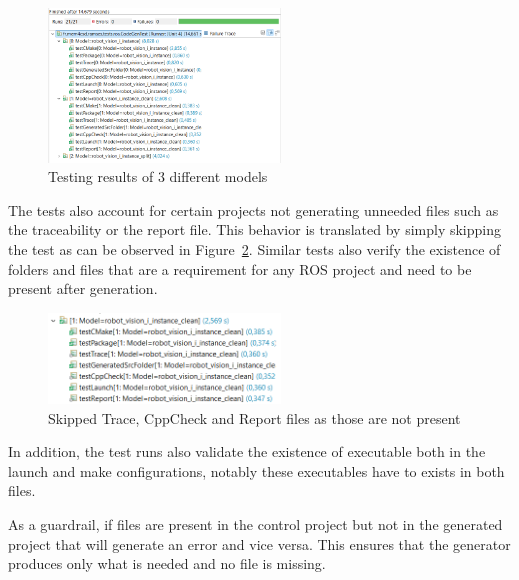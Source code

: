 \begin{figure}[htbp]
	\centering
	\includegraphics[width=0.55\textwidth]{testingResults1.png}
	\caption{Testing results of 3 different models}
	\label{fig:testingResults1}
\end{figure}

The tests also account for certain projects not generating unneeded files such as the traceability or the report file. This behavior is translated by simply skipping the test as can be observed in Figure~\ref{fig:testingResultsSkip1}. Similar tests also verify the existence of folders and files that are a requirement for any \gls{ROS} project and need to be present after generation.

\begin{figure}[htbp]
	\centering
	\includegraphics[width=0.55\textwidth]{testingResultsSkip1.png}
	\caption{Skipped Trace, CppCheck and Report files as those are not present}
	\label{fig:testingResultsSkip1}
\end{figure}

In addition, the test runs also validate the existence of executable both in the launch and make configurations, notably these executables have to exists in both files. 

As a guardrail, if files are present in the control project but not in the generated project that will generate an error and vice versa. This ensures that the generator produces only what is needed and no file is missing.

